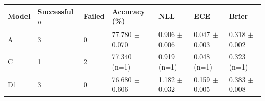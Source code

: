 \begin{tabular}{lllllll}
\toprule
Model & Successful $n$ & Failed & Accuracy (\%) & NLL & ECE & Brier \\
\midrule
A & 3 & 0 & 77.780 $\pm$ 0.070 & 0.906 $\pm$ 0.006 & 0.047 $\pm$ 0.003 & 0.318 $\pm$ 0.002 \\
C & 1 & 2 & 77.340 (n=1) & 0.919 (n=1) & 0.048 (n=1) & 0.323 (n=1) \\
D1 & 3 & 0 & 76.680 $\pm$ 0.606 & 1.182 $\pm$ 0.032 & 0.159 $\pm$ 0.005 & 0.383 $\pm$ 0.008 \\
\bottomrule
\end{tabular}
